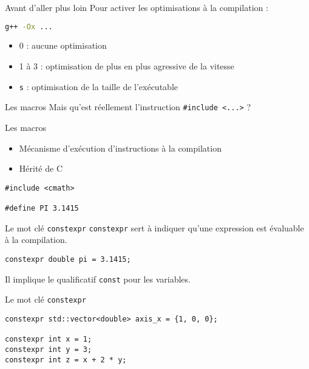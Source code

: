 
\begin{frame}[fragile]{Avant d'aller plus loin}
  Pour activer les optimisations à la compilation :
  \begin{lstlisting}[language=bash]
g++ -Ox ...
  \end{lstlisting}

  \begin{itemize}
    \item 0 : aucune optimisation
    \item 1 à 3 : optimisation de plus en plus agressive de la vitesse
    \item \texttt{s} : optimisation de la taille de l'exécutable
  \end{itemize}
\end{frame}

\begin{frame}{Les macros}
  Mais qu'est réellement l'instruction \texttt{\#include <...>} ?
\end{frame}

\begin{frame}[fragile]{Les macros}
  \begin{itemize}
    \item Mécanisme d'exécution d'instructions à la compilation
    \item Hérité de C
  \end{itemize}

  \begin{lstlisting}
#include <cmath>

#define PI 3.1415
  \end{lstlisting}
\end{frame}

\begin{frame}[fragile]{Le mot clé \texttt{constexpr}}
  \texttt{constexpr} sert à indiquer qu'une expression est évaluable à la compilation.

  \begin{lstlisting}
constexpr double pi = 3.1415;
  \end{lstlisting}

  Il implique le qualificatif \texttt{const} pour les variables.  
\end{frame}

\begin{frame}[fragile]{Le mot clé \texttt{constexpr}}
  \begin{lstlisting}
constexpr std::vector<double> axis_x = {1, 0, 0};

constexpr int x = 1;
constexpr int y = 3;
constexpr int z = x + 2 * y;
  \end{lstlisting}
\end{frame}
